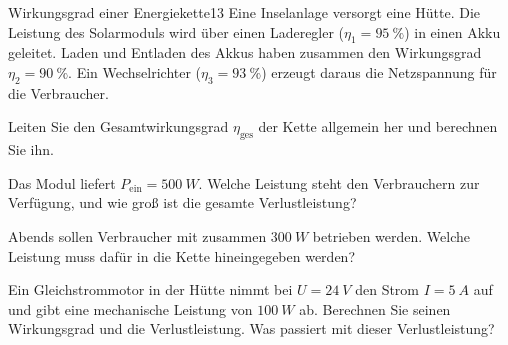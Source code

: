 \documentclass[11pt,a4paper]{article}
\begin{document}
\begin{aufgabe}{Wirkungsgrad einer Energiekette}{13}
Eine Inselanlage versorgt eine Hütte. Die Leistung des Solarmoduls wird über einen Laderegler ($\eta_1 = \SI{95}{\percent}$) in einen Akku geleitet. Laden und Entladen des Akkus haben zusammen den Wirkungsgrad $\eta_2 = \SI{90}{\percent}$. Ein Wechselrichter ($\eta_3 = \SI{93}{\percent}$) erzeugt daraus die Netzspannung für die Verbraucher.
\begin{center}
\end{center}
\begin{teilaufgaben}
  \item Leiten Sie den Gesamtwirkungsgrad $\eta_\text{ges}$ der Kette allgemein her und berechnen Sie ihn.
  \item Das Modul liefert $P_\text{ein} = \SI{500}{W}$. Welche Leistung steht den Verbrauchern zur Verfügung, und wie groß ist die gesamte Verlustleistung?
  \item Abends sollen Verbraucher mit zusammen $\SI{300}{W}$ betrieben werden. Welche Leistung muss dafür in die Kette hineingegeben werden?
  \item Ein Gleichstrommotor in der Hütte nimmt bei $U = \SI{24}{V}$ den Strom $I = \SI{5}{A}$ auf und gibt eine mechanische Leistung von $\SI{100}{W}$ ab. Berechnen Sie seinen Wirkungsgrad und die Verlustleistung. Was passiert mit dieser Verlustleistung?
\end{teilaufgaben}
\end{aufgabe}
\end{document}
